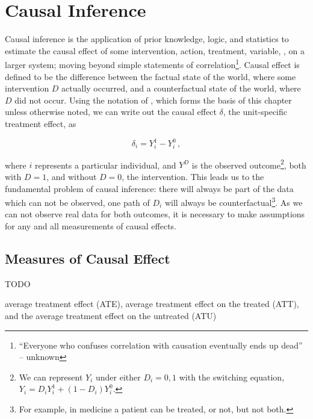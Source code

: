 \chapter{Causal Inference}
\label{chap:causal_inference}

Causal inference is the application of prior knowledge, logic, and statistics
to estimate the causal effect of some intervention, action, treatment, variable, \etc, on a larger system;
moving beyond simple statements of correlation\footnote{``Everyone who confuses correlation with causation eventually ends up dead'' -- unknown}.
Causal effect is defined to be the difference between
the factual state of the world, where some intervention $D$ actually occurred,
and a counterfactual state of the world, where $D$ did not occur.
Using the notation of \cite{CausalMixtape}, which forms the basis of this chapter unless otherwise noted,
we can write out the causal effect $\delta$, \ie the unit-specific treatment effect, as

\begin{equation}\label{eq:causal_effect_delta}
\delta_{i} = Y_{i}^{1} - Y_{i}^{0}\,,
\end{equation}

\noindent where $i$ represents a particular individual,
and $Y^{D}$ is the observed outcome\footnote{We can represent
$Y_{i}$ under either $D_{i}=0,1$ with the switching equation,
$Y_{i} = D_{i} Y_{i}^{1} + \left(1-D_{i}\right) Y_{i}^{0}$.},
both with $D=1$, and without $D=0$, the intervention.
This leads us to the fundamental problem of causal inference:
there will always be part of the data which can not be observed,
\ie one path of $D_{i}$ will always be counterfactual\footnote{For example,
in medicine a patient can be treated, or not, but not both.}.
As we can not observe real data for both outcomes,
it is necessary to make assumptions for any and all measurements of causal effects.

\section{Measures of Causal Effect}
\label{causal_inference:Measures}
TODO

average treatment effect (ATE),
average treatment effect on the treated (ATT),
and the
average treatment effect on the untreated (ATU)

